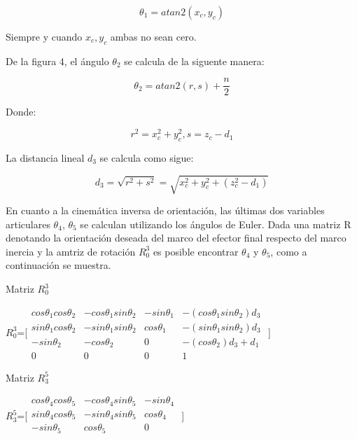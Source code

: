 \documentclass[letter,openright,12pt,spanish]{report}
\begin{document}
\begin{displaymath}
\theta_1 = atan2(x_c, y_c)
\end{displaymath}

Siempre y cuando $x_c, y_c$ ambas no sean cero.

De la figura 4, el \'angulo $\theta_2$ se calcula de la siguente manera:

\begin{displaymath}
\theta_2 =atan2(r,s)+ \frac{n}{2}
\end{displaymath}

Donde:

\begin{displaymath}
r^2=x^2_c+y^2_c,s=z_c-d_1
\end{displaymath}

La distancia lineal $d_3$ se calcula como sigue:

\begin{displaymath}
d_3=\sqrt{r^2+s^2}=\sqrt{x^2_c+y^2_c+(z^2_c-d_1)}
\end{displaymath}

En cuanto a la cinem\'atica inversa de orientaci\'on, las \'ultimas dos variables articulares $\theta_4$, $\theta_5$ se calculan utilizando los \'angulos de Euler. Dada una matriz R denotando la orientaci\'on deseada del marco del efector final respecto del marco inercia y la amtriz de rotaci\'on $R^3_0$ es posible encontrar $\theta_4$ y $\theta_5$, como a continuaci\'on se muestra.

 Matriz $R^3_0$

\begin{center}
$R^3_0$=[$\begin{matrix}
	cos\theta_1cos\theta_2 & -cos\theta_1sin\theta_2 & -sin\theta_1 & -(cos\theta_1sin\theta_2)d_3\\
	sin\theta_1cos\theta_2 & -sin\theta_1sin\theta_2 & cos\theta_1 & -(sin\theta_1sin\theta_2)d_3\\
	-sin\theta_2 & -cos\theta_2 & 0 & -(cos\theta_2)d_3+d_1\\
	0 & 0 & 0 & 1
\end{matrix}$ ]
\end{center}

Matriz $R^5_3$

\begin{center}
$R^5_3$=[$\begin{matrix}
	cos\theta_4cos\theta_5 & -cos\theta_4sin\theta_5 & -sin\theta_4\\
	sin\theta_4cos\theta_5 & -sin\theta_4sin\theta_5 & cos\theta_4\\
	-sin\theta_5 & cos\theta_5 & 0 \\
\end{matrix}$ ]
\end{center}
\end{document}
